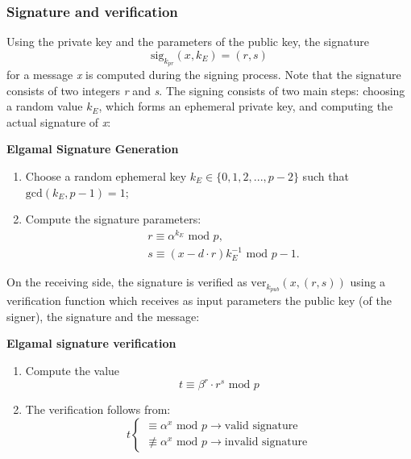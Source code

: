 \documentclass[11pt, a4paper]{article}
\newcommand{\mymod}{
    \text{ mod }
}
\begin{document}
\subsubsection{Signature and verification}
Using the private key and the parameters of the public key, the signature
$$\text{sig}_{k_{pr}}(x,k_E)=(r,s)$$
for a message \textit{x} is computed during the signing process. Note that the signature consists of two integers \textit{r} and \textit{s}. The signing consists of two main steps: choosing a random value $k_E$, which forms an ephemeral private key, and computing the actual signature of \textit{x}:
\begin{framed}
    \hfill\break\textbf{Elgamal Signature Generation}
    \begin{enumerate}
        \item Choose a random ephemeral key $k_E\in\{0,1,2,...,p-2\}$ such that $\text{gcd}(k_E,p-1)=1$;
        \item Compute the signature parameters:
        \begin{align*}
            &r\equiv\alpha^{k_E}\mymod p,\\
            &s\equiv(x-d\cdot r)k_E^{-1}\mymod p-1.
        \end{align*}
    \end{enumerate}
\end{framed}
On the receiving side, the signature is verified as $\text{ver}_{k_{pub}}(x, (r,s))$ using a verification function which receives as input parameters the public key (of the signer), the signature and the message:
\begin{framed}
    \hfill\break\textbf{Elgamal signature verification}
    \begin{enumerate}
        \item Compute the value
        $$t\equiv\beta^r\cdot r^s\mymod p$$
        \item The verification follows from:
        \begin{equation*}
            t\begin{cases}
                \equiv\alpha^x\mymod p\longrightarrow\text{valid signature}\\
                \not\equiv\alpha^x\mymod p\longrightarrow\text{invalid signature}
            \end{cases}
        \end{equation*}
    \end{enumerate}
\end{framed}

\newpage
\end{document}
